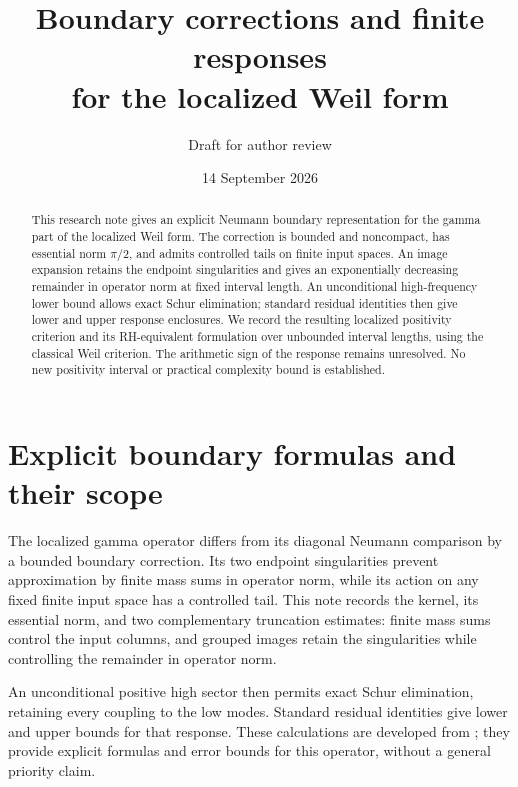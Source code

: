 
\newcommand{\MainManuscript}{1}
\title{Boundary corrections and finite responses\\for the localized Weil form}
\author{Draft for author review}
\date{14 September 2026}
\maketitle
\begin{abstract}
This research note gives an explicit Neumann boundary representation for
the gamma part of the localized Weil form. The correction is bounded and
noncompact, has essential norm $\pi/2$, and admits controlled tails on finite
input spaces. An image expansion retains the endpoint singularities and
gives an exponentially decreasing remainder in operator norm at fixed interval
length. An unconditional high-frequency lower bound allows exact Schur
elimination; standard residual identities then give lower and upper response
enclosures. We record the resulting localized positivity criterion and its
RH-equivalent formulation over unbounded interval lengths, using the classical
Weil criterion. The arithmetic sign of the response remains unresolved.
No new positivity interval or practical complexity bound is established.
\end{abstract}

\section{Explicit boundary formulas and their scope}
The localized gamma operator differs from its diagonal Neumann comparison
by a bounded boundary correction. Its two endpoint singularities prevent
approximation by finite mass sums in operator norm, while its action on
any fixed finite input space has a controlled tail. This note records the
kernel, its essential norm, and two complementary truncation estimates:
finite mass sums control the input columns, and grouped images retain the
singularities while controlling the remainder in operator norm.

An unconditional positive high sector then permits exact Schur elimination,
retaining every coupling to the low modes. Standard residual identities
give lower and upper bounds for that response. These calculations are
developed from \cite{Investigation}; they provide explicit formulas and
error bounds for this operator, without a general priority claim.

